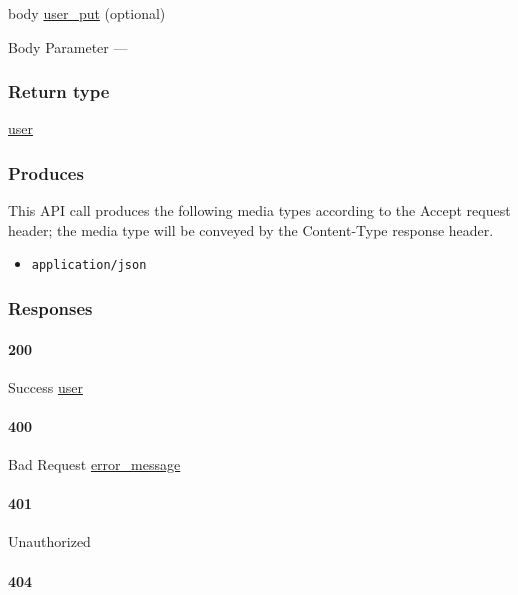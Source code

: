 body \protect\hyperlink{user_put}{user\_put} (optional)

{Body Parameter} ---

\hypertarget{return-type-8}{%
\subsubsection{Return type}\label{return-type-8}}

\protect\hyperlink{user}{user}

\hypertarget{produces-11}{%
\subsubsection{Produces}\label{produces-11}}

This API call produces the following media types according to the
{Accept} request header; the media type will be conveyed by the
{Content-Type} response header.

\begin{itemize}
\tightlist
\item
  \texttt{application/json}
\end{itemize}

\hypertarget{responses-11}{%
\subsubsection{Responses}\label{responses-11}}

\hypertarget{section-36}{%
\paragraph{200}\label{section-36}}

Success \protect\hyperlink{user}{user}

\hypertarget{section-37}{%
\paragraph{400}\label{section-37}}

Bad Request \protect\hyperlink{error_message}{error\_message}

\hypertarget{section-38}{%
\paragraph{401}\label{section-38}}

Unauthorized \protect\hyperlink{}{}

\hypertarget{section-39}{%
\paragraph{404}\label{section-39}}

